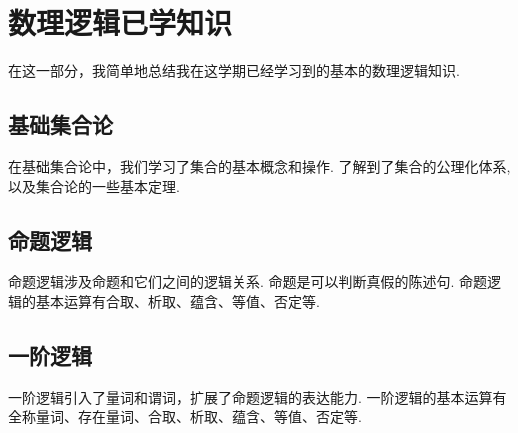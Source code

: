 \section{数理逻辑已学知识}
在这一部分，我简单地总结我在这学期已经学习到的基本的数理逻辑知识.

\subsection{基础集合论}
在基础集合论中，我们学习了集合的基本概念和操作. 了解到了集合的公理化体系, 以及集合论的一些基本定理.

\subsection{命题逻辑}
命题逻辑涉及命题和它们之间的逻辑关系. 命题是可以判断真假的陈述句. 命题逻辑的基本运算有合取、析取、蕴含、等值、否定等.

\subsection{一阶逻辑}
一阶逻辑引入了量词和谓词，扩展了命题逻辑的表达能力. 一阶逻辑的基本运算有全称量词、存在量词、合取、析取、蕴含、等值、否定等.
